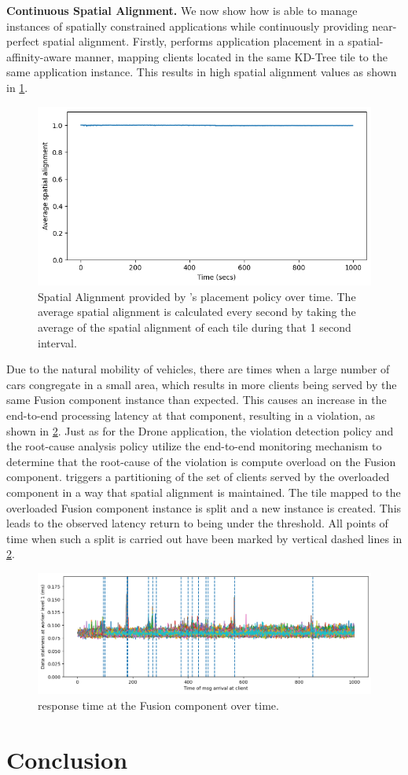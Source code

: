 \par \noindent \textbf{Continuous Spatial Alignment. } We now show how \oneedge{} is able to manage instances of spatially constrained applications while continuously providing near-perfect spatial alignment. Firstly, \oneedge{} performs application placement in a spatial-affinity-aware manner, mapping clients located in the same KD-Tree tile to the same application instance. This results in high spatial alignment values as shown in \cref{fig:mapfusion_spatial_alignment}.
\begin{figure}[ht]
  \centering
    \includegraphics[width=0.8\columnwidth]{figures/oneedge/spatial_alignment_vs_time.png}
    \caption{Spatial Alignment provided by \oneedge{}'s placement policy over time. The average spatial alignment is calculated every second by taking the average of the spatial alignment of each tile during that 1 second interval.}
    \label{fig:mapfusion_spatial_alignment}
\end{figure}
Due to the natural mobility of vehicles, there are times when a large number of cars congregate in a small area, which results in more clients being served by the same Fusion component instance than expected. This causes an increase in the end-to-end processing latency at that component, resulting in a violation, as shown in \cref{fig:mapfusion_latency}. Just as for the Drone application, the violation detection policy and the root-cause analysis policy utilize the end-to-end monitoring mechanism to determine that the root-cause of the violation is compute overload on the Fusion component. \oneedge{} triggers a partitioning of the set of clients served by the overloaded component in a way that spatial alignment is maintained. The tile mapped to the overloaded Fusion component instance is split and a new instance is created. This leads to the observed latency return to being under the threshold. All points of time when such a split is carried out have been marked by vertical dashed lines in \cref{fig:mapfusion_latency}.
\begin{figure}[ht]
  \centering
    \includegraphics[width=0.8\columnwidth]{figures/oneedge/mapfusion_latencies.png}
    \caption{response time at the Fusion component over time.}
    \label{fig:mapfusion_latency}
\end{figure}

\section{Conclusion}
\label{sec:oneedge_conclusion}